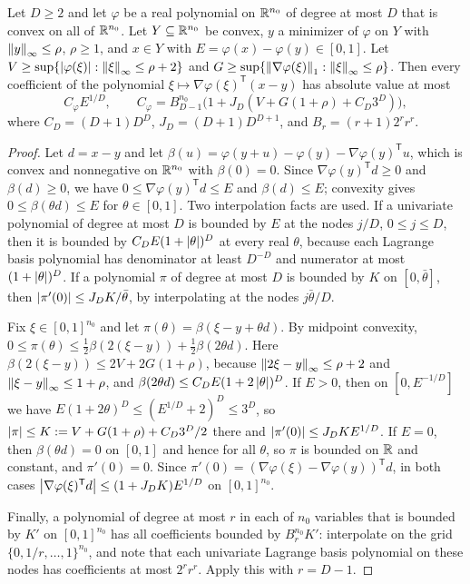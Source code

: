 \begin{lemma}
\label{lem:recourse-bregman}
Let $D\ge2$ and let $\varphi$ be a real polynomial on $\mathbb R^{n_0}$ of degree
at most $D$ that is convex on all of $\mathbb R^{n_0}$. Let $Y\subseteq\mathbb R^{n_0}$ be
convex, $y$ a minimizer of $\varphi$ on $Y$ with $\left\lVert y\right\rVert_\infty\le\rho$,
$\rho\ge1$, and $x\in Y$ with $E=\varphi(x)-\varphi(y)\in[0,1]$. Let
$V\ge\sup\{\left\lvert\varphi(\xi)\right\rvert:\left\lVert\xi\right\rVert_\infty\le\rho+2\}$ and
$G\ge\sup\{\left\lVert\nabla\varphi(\xi)\right\rVert_1:\left\lVert\xi\right\rVert_\infty\le\rho\}$. Then
every coefficient of the polynomial $\xi\mapsto\nabla\varphi(\xi)^{\mathsf T}(x-y)$
has absolute value at most
\[
 C_\varphi E^{1/D},\qquad
 C_\varphi=B_{D-1}^{n_0}\bigl(1+J_D(V+G(1+\rho)+C_D3^D)\bigr),
\]
where $C_D=(D+1)D^D$, $J_D=(D+1)D^{D+1}$, and $B_r=(r+1)2^rr^r$.
\end{lemma}

\begin{proof}
Let $d=x-y$ and let
$\beta(u)=\varphi(y+u)-\varphi(y)-\nabla\varphi(y)^{\mathsf T}u$, which is
convex and nonnegative on $\mathbb R^{n_0}$ with $\beta(0)=0$. Since
$\nabla\varphi(y)^{\mathsf T}d\ge0$ and $\beta(d)\ge0$, we have
$0\le\nabla\varphi(y)^{\mathsf T}d\le E$ and $\beta(d)\le E$; convexity
gives $0\le\beta(\theta d)\le E$ for $\theta\in[0,1]$. Two
interpolation facts are used. If a univariate polynomial of degree at
most $D$ is bounded by $E$ at the nodes $j/D$, $0\le j\le D$, then it is
bounded by $C_DE(1+\left\lvert\theta\right\rvert)^D$ at every real $\theta$, because each
Lagrange basis polynomial has denominator at least $D^{-D}$ and
numerator at most $(1+\left\lvert\theta\right\rvert)^D$. If a polynomial $\pi$ of degree
at most $D$ is bounded by $K$ on $[0,\bar\theta]$, then
$\left\lvert\pi'(0)\right\rvert\le J_DK/\bar\theta$, by interpolating at the nodes
$j\bar\theta/D$.

Fix $\xi\in[0,1]^{n_0}$ and let $\pi(\theta)=\beta(\xi-y+\theta d)$. By
midpoint convexity,
$0\le\pi(\theta)\le\frac12\beta(2(\xi-y))+\frac12\beta(2\theta d)$. Here
$\beta(2(\xi-y))\le2V+2G(1+\rho)$, because $\left\lVert2\xi-y\right\rVert_\infty\le\rho+2$
and $\left\lVert\xi-y\right\rVert_\infty\le1+\rho$, and
$\beta(2\theta d)\le C_DE(1+2\left\lvert\theta\right\rvert)^D$. If $E>0$, then on
$[0,E^{-1/D}]$ we have $E(1+2\theta)^D\le(E^{1/D}+2)^D\le3^D$, so
$\left\lvert\pi\right\rvert\le K:=V+G(1+\rho)+C_D3^D/2$ there and
$\left\lvert\pi'(0)\right\rvert\le J_DKE^{1/D}$. If $E=0$, then $\beta(\theta d)=0$ on
$[0,1]$ and hence for all $\theta$, so $\pi$ is bounded on $\mathbb R$ and
constant, and $\pi'(0)=0$. Since
$\pi'(0)=(\nabla\varphi(\xi)-\nabla\varphi(y))^{\mathsf T}d$, in both cases
$\left\lvert\nabla\varphi(\xi)^{\mathsf T}d\right\rvert\le(1+J_DK)E^{1/D}$ on $[0,1]^{n_0}$.

Finally, a polynomial of degree at most $r$ in each of $n_0$ variables
that is bounded by $K'$ on $[0,1]^{n_0}$ has all coefficients bounded by
$B_r^{n_0}K'$: interpolate on the grid $\{0,1/r,\ldots,1\}^{n_0}$, and note that
each univariate Lagrange basis polynomial on these nodes has
coefficients at most $2^rr^r$. Apply this with $r=D-1$.
\end{proof}

